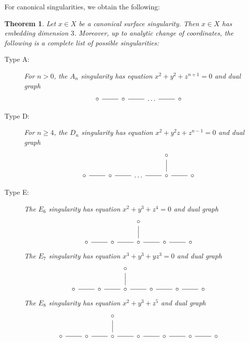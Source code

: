 \documentclass[leqno, openany]{memoir}
\newtheorem{thm}{Theorem}[section]
\theoremstyle{definition}
\theoremstyle{remark}
\theoremstyle{plain}
\theoremstyle{definition}
\theoremstyle{remark}
\begin{document}
For canonical singularities, we obtain the following:
\begin{thm}
    Let $x \in X$ be a canonical surface singularity. Then $x \in X$ has embedding dimension $3$. Moreover, up to analytic change of coordinates, the following is a complete list of possible singularities:
    \begin{description}
        \item[Type A:] For $n > 0$, the $A_n$ singularity has equation $x^2 + y^2 + z^{n+1} = 0$ and dual graph
            \begin{equation*}
            \begin{tikzcd}
                \circ \ar[-]{r} & \circ \ar[-]{r} & \ldots \ar[-]{r} & \circ
            \end{tikzcd}
            \end{equation*}
        \item[Type D:] For $n \geq 4$, the $D_n$ singularity has equation $x^2 + y^2z + z^{n-1} = 0$ and dual graph
            \begin{equation*}
            \begin{tikzcd}
                & & & \circ \ar[-]{d} \\
                \circ \ar[-]{r} & \circ \ar[-]{r} & \ldots \ar[-]{r} & \circ \ar[-]{r} & \circ
            \end{tikzcd}
            \end{equation*}
        \item[Type E:] The $E_6$ singularity has equation $x^2 + y^3 + z^4 = 0$ and dual graph
            \begin{equation*}
            \begin{tikzcd}
                & & \circ \ar[-]{d} \\
                \circ \ar[-]{r} & \circ \ar[-]{r} & \circ \ar[-]{r} & \circ \ar[-]{r} & \circ
            \end{tikzcd}
            \end{equation*}
            The $E_7$ singularity has equation $x^3 + y^3 + yz^3 = 0$ and dual graph
            \begin{equation*}
            \begin{tikzcd}
                & & \circ \ar[-]{d} \\
                \circ \ar[-]{r} & \circ \ar[-]{r} & \circ \ar[-]{r} & \circ \ar[-]{r} & \circ \ar[-]{r} & \circ
            \end{tikzcd}
            \end{equation*}
            The $E_8$ singularity has equation $x^2 + y^3 + z^5$ and dual graph
            \begin{equation*}
            \begin{tikzcd}
                & & \circ \ar[-]{d} \\
                \circ \ar[-]{r} & \circ \ar[-]{r} & \circ \ar[-]{r} & \circ \ar[-]{r} & \circ \ar[-]{r} & \circ \ar[-]{r} & \circ
            \end{tikzcd}
            \end{equation*}
    \end{description}
\end{thm}
\end{document}
